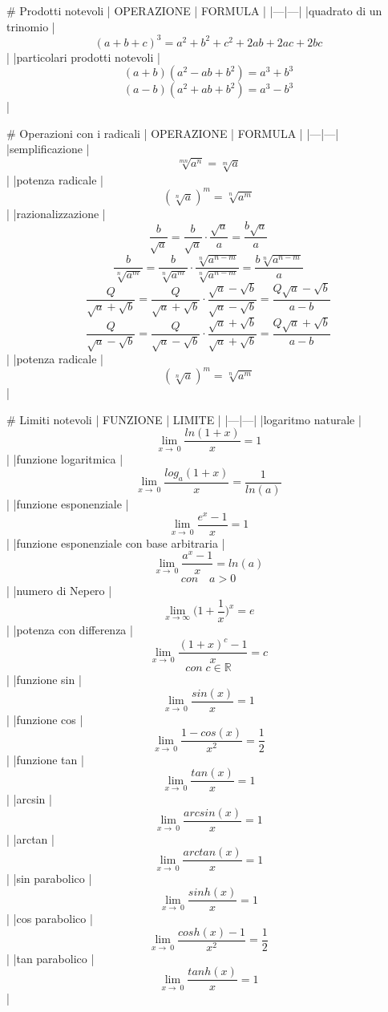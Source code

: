 # Prodotti notevoli
| OPERAZIONE | FORMULA |
|---|---|
|quadrato di un trinomio | $$(a+b+c)^3= a^2 + b^2 + c^2 + 2ab + 2ac + 2bc$$ |
|particolari prodotti notevoli | $$(a+b)(a^2-ab+b^2)=a^3+b^3$$ $$(a-b)(a^2+ab+b^2)=a^3-b^3$$|

# Operazioni con i radicali
| OPERAZIONE | FORMULA |
|---|---|
|semplificazione | $$\sqrt[mn]{a^n} = \sqrt[m]{a}$$ |
|potenza radicale | $$(\sqrt[n]{a})^m = \sqrt[n]{a^m}$$ |
|razionalizzazione | $$\frac{b}{\sqrt{a}}=\frac{b}{\sqrt{a}} \cdot \frac{\sqrt{a}}{a} = \frac{b \sqrt{a}}{a}$$ $$\frac{b}{\sqrt[n]{a^m}}=\frac{b}{\sqrt[n]{a^m}} \cdot \frac{\sqrt[n]{a^{n-m}}}{\sqrt[n]{a^{n-m}}} = \frac{b \sqrt[n]{a^{n-m}}}{a}$$ $$\frac{Q}{\sqrt{a} + \sqrt{b}}=\frac{Q}{\sqrt{a} + \sqrt{b}} \cdot \frac{\sqrt{a} - \sqrt{b}}{\sqrt{a} - \sqrt{b}} = \frac{Q \sqrt{a} - \sqrt{b}}{a-b}$$ $$\frac{Q}{\sqrt{a} - \sqrt{b}}=\frac{Q}{\sqrt{a} - \sqrt{b}} \cdot \frac{\sqrt{a} + \sqrt{b}}{\sqrt{a} + \sqrt{b}} = \frac{Q \sqrt{a} + \sqrt{b}}{a-b}$$ |
|potenza radicale | $$(\sqrt[n]{a})^m = \sqrt[n]{a^m}$$ |

# Limiti notevoli
| FUNZIONE | LIMITE |
|---|---|
|logaritmo naturale | $$\lim_{x\to\ 0} \frac{ln(1+x)}{x}=1$$ |
|funzione logaritmica | $$\lim_{x\to\ 0} \frac{log_a{(1+x)}}{x}= \frac{1}{ln(a)}$$ |
|funzione esponenziale | $$\lim_{x\to\ 0} \frac{e^x -1}{x}=1$$ |
|funzione esponenziale con base arbitraria | $$\lim_{x\to\ 0} \frac{a^x -1}{x}=ln(a)$$ $$con \quad a>0$$|
|numero di Nepero | $$\lim_{x\to\infty} \bigg(1+ \frac{1}{x} \bigg)^x=e$$ |
|potenza con differenza | $$\lim_{x\to\ 0} \frac{(1+x)^c -1}{x}=c$$ $$con \; c \in \mathbb{R} $$ |
|funzione sin | $$\lim_{x\to\ 0} \frac{sin(x)}{x}=1$$ |
|funzione cos | $$\lim_{x\to\ 0} \frac{1-cos(x)}{x^2}= \frac{1}{2}$$ |
|funzione tan | $$\lim_{x\to\ 0} \frac{tan(x)}{x}=1$$ |
|arcsin | $$\lim_{x\to\ 0} \frac{arcsin(x)}{x}=1$$ |
|arctan | $$\lim_{x\to\ 0} \frac{arctan(x)}{x}=1$$ |
|sin parabolico | $$\lim_{x\to\ 0} \frac{sinh(x)}{x}=1$$ |
|cos parabolico | $$\lim_{x\to\ 0} \frac{cosh(x)-1}{x^2}= \frac{1}{2}$$ |
|tan parabolico | $$\lim_{x\to\ 0} \frac{tanh(x)}{x}=1$$ |

